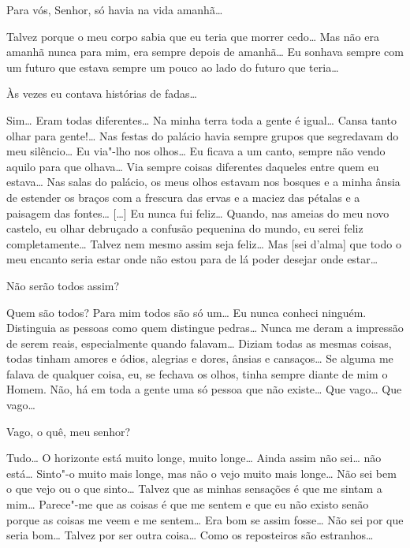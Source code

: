  Para vós, Senhor, só havia na vida amanhã\ldots{}

 Talvez porque o meu corpo sabia que eu teria que morrer
cedo\ldots{} Mas não era amanhã nunca para mim, era sempre depois de
amanhã\ldots{} Eu sonhava sempre com um futuro que estava sempre um pouco
ao lado do futuro que teria\ldots{}

 Às vezes eu contava histórias de fadas\ldots{}

 Sim\ldots{} Eram todas diferentes\ldots{} Na minha terra toda a
gente é igual\ldots{} Cansa tanto olhar para gente!\ldots{} Nas festas do
palácio havia sempre grupos que segredavam do meu silêncio\ldots{} Eu
via"-lho nos olhos\ldots{} Eu ficava a um canto, sempre não vendo aquilo
para que olhava\ldots{} Via sempre coisas diferentes daqueles entre quem
eu estava\ldots{} Nas salas do palácio, os meus olhos estavam nos bosques
e a minha ânsia de estender os braços com a frescura das ervas e a
maciez das pétalas e a paisagem das fontes\ldots{} [\ldots{}] Eu nunca fui
feliz\ldots{} Quando, nas ameias do meu novo castelo, eu olhar debruçado a
confusão pequenina do mundo, eu serei feliz completamente\ldots{} Talvez
nem mesmo assim seja feliz\ldots{} Mas [sei d'alma] que
todo o meu encanto seria estar onde não estou para de lá poder
desejar onde estar\ldots{}

 Não serão todos assim?

 Quem são todos? Para mim todos são só um\ldots{} Eu nunca
conheci ninguém. Distinguia as pessoas como quem distingue pedras\ldots{}
Nunca me deram a impressão de serem reais, especialmente quando
falavam\ldots{} Diziam todas as mesmas coisas, todas tinham amores e
ódios, alegrias e dores, ânsias e cansaços\ldots{} Se alguma me falava de
qualquer coisa, eu, se fechava os olhos, tinha sempre diante de mim o
Homem. Não, há em toda a gente uma só pessoa que não existe\ldots{} Que
vago\ldots{} Que vago\ldots{}

 Vago, o quê, meu senhor?

 Tudo\ldots{} O horizonte está muito longe, muito longe\ldots{}
Ainda assim não sei\ldots{} não está\ldots{} Sinto"-o muito mais longe, mas não
o vejo muito mais longe\ldots{} Não sei bem o que vejo ou o que sinto\ldots{}
Talvez que as minhas sensações é que me sintam a mim\ldots{} Parece"-me que
as coisas é que me sentem e que eu não existo senão porque as coisas
me veem e me sentem\ldots{} Era bom se assim fosse\ldots{} Não sei por que
seria bom\ldots{} Talvez por ser outra coisa\ldots{} Como os reposteiros são
estranhos\ldots{}

